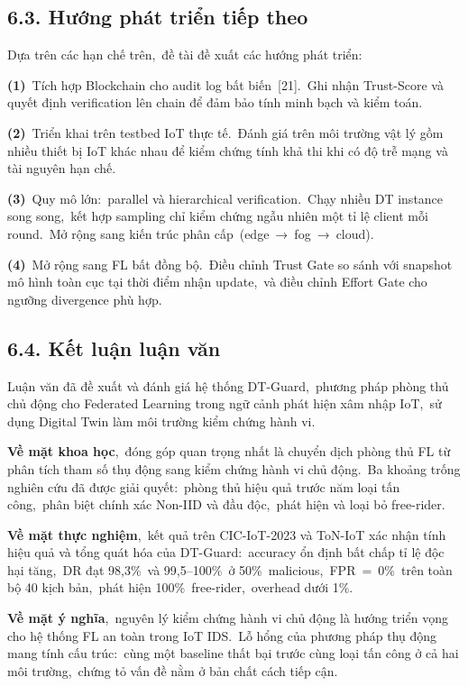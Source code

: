 \subsection{6.3. Hướng phát triển tiếp theo}\label{hux1b0ux1edbng-phuxe1t-triux1ec3n-tiux1ebfp-theo}

Dựa trên các hạn chế trên,~đề tài đề xuất các hướng phát triển:

\textbf{(1)}~Tích hợp Blockchain cho audit log bất biến~{[}21{]}.~Ghi nhận Trust-Score và quyết định verification lên chain để đảm bảo tính minh bạch và kiểm toán.

\textbf{(2)}~Triển khai trên testbed IoT thực tế.~Đánh giá trên môi trường vật lý gồm nhiều thiết bị IoT khác nhau để kiểm chứng tính khả thi khi có độ trễ mạng và tài nguyên hạn chế.

\textbf{(3)}~Quy mô lớn:~parallel và hierarchical verification.~Chạy nhiều DT instance song song,~kết hợp sampling chỉ kiểm chứng ngẫu nhiên một tỉ lệ client mỗi round.~Mở rộng sang kiến trúc phân cấp~(edge~→~fog~→~cloud).

\textbf{(4)}~Mở rộng sang FL bất đồng bộ.~Điều chỉnh Trust Gate so sánh với snapshot mô hình toàn cục tại thời điểm nhận update,~và điều chỉnh Effort Gate cho ngưỡng divergence phù hợp.

\subsection{6.4. Kết luận luận văn}\label{kux1ebft-luux1eadn-luux1eadn-vux103n}

Luận văn đã đề xuất và đánh giá hệ thống DT-Guard,~phương pháp phòng thủ chủ động cho Federated Learning trong ngữ cảnh phát hiện xâm nhập IoT,~sử dụng Digital Twin làm môi trường kiểm chứng hành vi.

\textbf{Về mặt khoa học},~đóng góp quan trọng nhất là chuyển dịch phòng thủ FL từ phân tích tham số thụ động sang kiểm chứng hành vi chủ động.~Ba khoảng trống nghiên cứu đã được giải quyết:~phòng thủ hiệu quả trước năm loại tấn công,~phân biệt chính xác Non-IID và đầu độc,~phát hiện và loại bỏ free-rider.

\textbf{Về mặt thực nghiệm},~kết quả trên CIC-IoT-2023 và ToN-IoT xác nhận tính hiệu quả và tổng quát hóa của DT-Guard:~accuracy ổn định bất chấp tỉ lệ độc hại tăng,~DR đạt 98,3\%~và 99,5--100\%~ở 50\%~malicious,~FPR~=~0\%~trên toàn bộ 40 kịch bản,~phát hiện 100\%~free-rider,~overhead dưới 1\%.

\textbf{Về mặt ý nghĩa},~nguyên lý kiểm chứng hành vi chủ động là hướng triển vọng cho hệ thống FL an toàn trong IoT IDS.~Lỗ hổng của phương pháp thụ động mang tính cấu trúc:~cùng một baseline thất bại trước cùng loại tấn công ở cả hai môi trường,~chứng tỏ vấn đề nằm ở bản chất cách tiếp cận.

